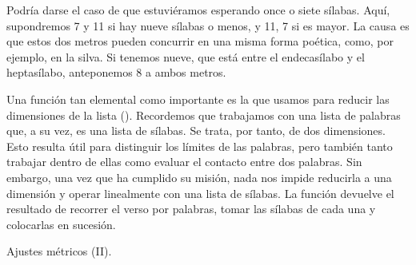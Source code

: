 Podría darse el caso de que estuviéramos esperando once o siete sílabas. Aquí, supondremos 7 y 11 si hay nueve sílabas o menos, y 11,  7 si es mayor. La causa es que estos dos metros pueden concurrir en una misma forma poética, como, por ejemplo, en la silva. Si tenemos nueve, que está entre el endecasílabo y el heptasílabo, anteponemos 8 a ambos metros.

Una función tan elemental como importante es la que usamos para reducir las dimensiones de la lista (). Recordemos que trabajamos con una lista de palabras que, a su vez, es una lista de sílabas. Se trata, por tanto, de dos dimensiones. Esto resulta útil para distinguir los límites de las palabras, pero también tanto trabajar dentro de ellas como evaluar el contacto entre dos palabras. Sin embargo, una vez que ha cumplido su misión, nada nos impide reducirla a una dimensión y operar linealmente con una lista de sílabas. La función devuelve el resultado de recorrer el verso por palabras, tomar las sílabas de cada una y colocarlas en sucesión.

\begin{algorithm}[!ht]
	\caption{Ajustes métricos (II).}\label{list:VerSeMetre18b}
\end{algorithm}

